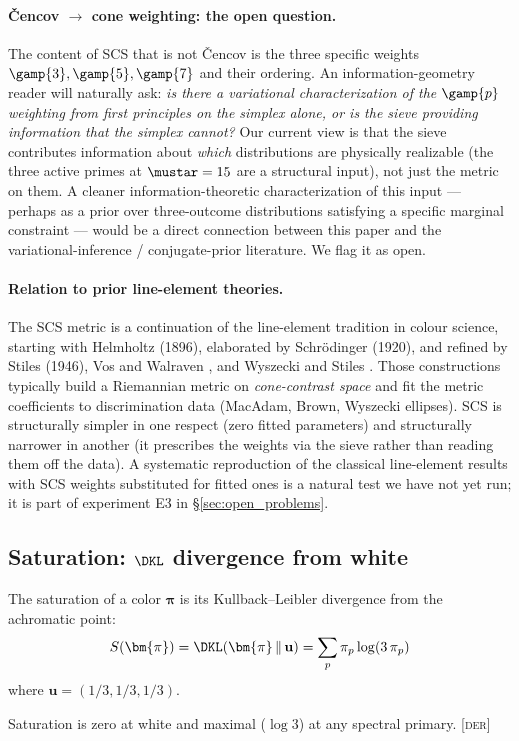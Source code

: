 \documentclass[12pt,a4paper]{article}
\begin{document}
\paragraph{Čencov $\to$ cone weighting: the open question.}
The content of SCS that is not \v{C}encov is the three specific
weights $\gamp{3}, \gamp{5}, \gamp{7}$ and their ordering. An
information-geometry reader will naturally ask: \emph{is there a
variational characterization of the $\gamp{p}$ weighting from first
principles on the simplex alone, or is the sieve providing information
that the simplex cannot?} Our current view is that the sieve
contributes information about \emph{which} distributions are physically
realizable (the three active primes at $\mustar = 15$ are a structural
input), not just the metric on them. A cleaner information-theoretic
characterization of this input --- perhaps as a prior over three-outcome
distributions satisfying a specific marginal constraint --- would be
a direct connection between this paper and the
variational-inference / conjugate-prior literature. We flag it as
open.

\paragraph{Relation to prior line-element theories.}
The SCS metric is a continuation of the line-element tradition in
colour science, starting with Helmholtz (1896), elaborated by
Schrödinger (1920), and refined by Stiles (1946), Vos and Walraven
\cite{voswalraven1972}, and Wyszecki and Stiles \cite{wyszecki2000}.
Those constructions typically build a Riemannian metric on
\emph{cone-contrast space} and fit the metric coefficients to
discrimination data (MacAdam, Brown, Wyszecki ellipses). SCS is
structurally simpler in one respect (zero fitted parameters) and
structurally narrower in another (it prescribes the weights via the
sieve rather than reading them off the data). A systematic
reproduction of the classical line-element results with SCS weights
substituted for fitted ones is a natural test we have not yet run;
it is part of experiment E3 in \S\ref{sec:open_problems}.

\subsection{Saturation: $\DKL$ divergence from white}

\begin{derivedbox}
The saturation of a color $\bm{\pi}$ is its Kullback--Leibler
divergence from the achromatic point:
\begin{equation}
  S(\bm{\pi}) = \DKL(\bm{\pi} \,\|\, \mathbf{u})
    = \sum_{p} \pi_p \log(3\,\pi_p)
  \label{eq:saturation}
\end{equation}
where $\mathbf{u} = (1/3, 1/3, 1/3)$.

Saturation is zero at white and maximal ($\log 3$) at any spectral
primary. \textsc{[der]}
\end{derivedbox}
\end{document}
